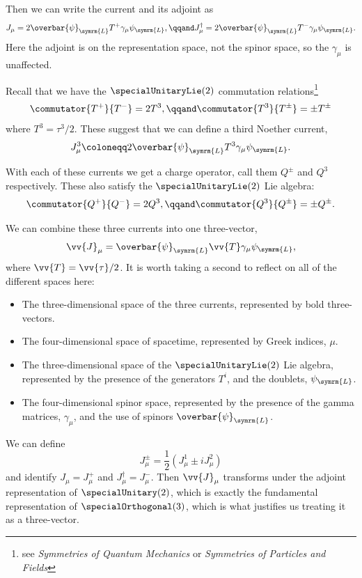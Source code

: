 \documentclass[fleqn]{NotesClass}
\newcommand*{\course}[1]{\textit{#1}}
\newcommand{\diracadjoint}[1]{\overbar{#1}}
\newcommand{\hermit}{\dagger}
\newcommand{\Left}{\symrm{L}}
\begin{document}
    Then we can write the current and its adjoint as
    \begin{equation}
        J_\mu = 2\diracadjoint{\psi}_{\Left}T^+ \gamma_\mu \psi_{\Left}, \qqand J_\mu^{\hermit} = 2\diracadjoint{\psi}_{\Left}T^- \gamma_\mu \psi_{\Left}.
    \end{equation}
    Here the adjoint is on the representation space, not the spinor space, so the \(\gamma_\mu\) is unaffected.
    
    Recall that we have the \(\specialUnitaryLie(2)\) commutation relations\footnote{see \course{Symmetries of Quantum Mechanics} or \course{Symmetries of Particles and Fields}}
    \begin{equation}
        \commutator{T^+}{T^-} = 2T^3, \qqand \commutator{T^3}{T^{\pm}} = \pm T^{\pm}
    \end{equation}
    where \(T^3 = \tau^3/2\).
    These suggest that we can define a third Noether current,
    \begin{equation}
        J^3_\mu \coloneqq 2\diracadjoint{\psi}_{\Left} T^3 \gamma_\mu \psi_{\Left}.
    \end{equation}
    
    With each of these currents we get a charge operator, call them \(Q^\pm\) and \(Q^3\) respectively.
    These also satisfy the \(\specialUnitaryLie(2)\) Lie algebra:
    \begin{equation}
        \commutator{Q^+}{Q^-} = 2Q^3, \qqand \commutator{Q^3}{Q^{\pm}} = \pm Q^{\pm}.
    \end{equation}
    
    We can combine these three currents into one three-vector,
    \begin{equation}
        \vv{J}_\mu = \diracadjoint{\psi}_{\Left} \vv{T} \gamma_\mu \psi_{\Left},
    \end{equation}
    where \(\vv{T} = \vv{\tau}/2\).
    It is worth taking a second to reflect on all of the different spaces here:
    \begin{itemize}
        \item The three-dimensional space of the three currents, represented by bold three-vectors.
        \item The four-dimensional space of spacetime, represented by Greek indices, \(\mu\).
        \item The three-dimensional space of the \(\specialUnitaryLie(2)\) Lie algebra, represented by the presence of the generators \(T^i\), and the doublets, \(\psi_{\Left}\).
        \item The four-dimensional spinor space, represented by the presence of the gamma matrices, \(\gamma_\mu\), and the use of spinors \(\diracadjoint{\psi}_{\Left}\).
    \end{itemize}
    We can define
    \begin{equation}
        J^{\pm}_{\mu} = \frac{1}{2}(J^1_\mu \pm iJ^2_\mu)
    \end{equation}
    and identify \(J_\mu = J_\mu^+\) and \(J_\mu^\hermit = J_\mu^-\).
    Then \(\vv{J}_\mu\) transforms under the adjoint representation of \(\specialUnitary(2)\), which is exactly the fundamental representation of \(\specialOrthogonal(3)\), which is what justifies us treating it as a three-vector.
    
\end{document}
